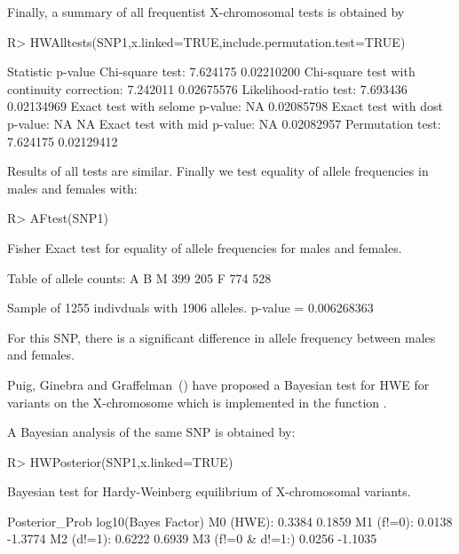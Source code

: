 \documentclass[nojss]{jss}
\begin{document}
Finally, a summary of all frequentist X-chromosomal tests is obtained by

\begin{Schunk}
\begin{Sinput}
R> HWAlltests(SNP1,x.linked=TRUE,include.permutation.test=TRUE)
\end{Sinput}
\begin{Soutput}
                                            Statistic    p-value
Chi-square test:                             7.624175 0.02210200
Chi-square test with continuity correction:  7.242011 0.02675576
Likelihood-ratio test:                       7.693436 0.02134969
Exact test with selome p-value:                    NA 0.02085798
Exact test with dost p-value:                      NA         NA
Exact test with mid p-value:                       NA 0.02082957
Permutation test:                            7.624175 0.02129412
\end{Soutput}
\end{Schunk}

Results of all tests are similar. Finally we test equality of allele frequencies in males and females with:

\begin{Schunk}
\begin{Sinput}
R> AFtest(SNP1)
\end{Sinput}
\begin{Soutput}
Fisher Exact test for equality of allele frequencies for males and females.

Table of allele counts:
    A   B
M 399 205
F 774 528

Sample of 1255 indivduals with 1906 alleles. p-value = 0.006268363
\end{Soutput}
\end{Schunk}

For this SNP, there is a significant difference in allele frequency 
between males and females. 

Puig, Ginebra and Graffelman~(\citeyear{Puig}) have proposed a Bayesian test for HWE for variants on the X-chromosome which is implemented in the function .

A Bayesian analysis of the same SNP is obtained by: 

\begin{Schunk}
\begin{Sinput}
R> HWPosterior(SNP1,x.linked=TRUE)
\end{Sinput}
\begin{Soutput}
Bayesian test for Hardy-Weinberg equilibrium of X-chromosomal variants.

                  Posterior_Prob log10(Bayes Factor)
M0 (HWE):                 0.3384              0.1859
M1 (f!=0):                0.0138             -1.3774
M2 (d!=1):                0.6222              0.6939
M3 (f!=0 & d!=1:)         0.0256             -1.1035
\end{Soutput}
\end{Schunk}
\end{document}
